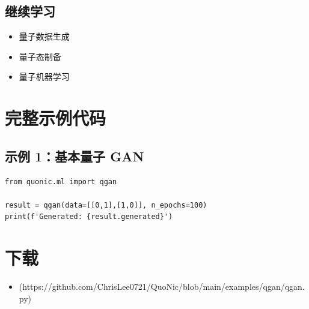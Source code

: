 \documentclass[12pt,a4paper]{article}
\begin{document}
\subsection{继续学习}
\begin{itemize}
  \item 量子数据生成
  \item 量子态制备
  \item 量子机器学习
\end{itemize}

\section{完整示例代码}

\subsection{示例 1：基本量子 GAN}

\begin{verbatim}
from quonic.ml import qgan

result = qgan(data=[[0,1],[1,0]], n_epochs=100)
print(f'Generated: {result.generated}')
\end{verbatim}

\section{下载}

\begin{itemize}
  \item [qgan.py](https://github.com/ChrisLee0721/QuoNic/blob/main/examples/qgan/qgan.py)
\end{itemize}
\end{document}
